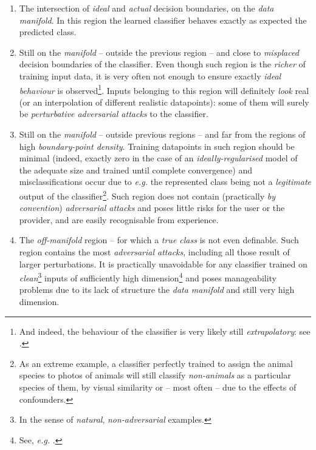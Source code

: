 \begin{enumerate}
    \item The intersection of \textit{ideal} and \textit{actual} decision boundaries, on the \textit{data manifold}. In this region the learned classifier behaves exactly as expected \wrt the predicted class.
    \item Still on the \textit{manifold} -- outside the previous region -- and close to \textit{misplaced} decision boundaries of the classifier. Even though such region is the \textit{richer} of training input data, it is very often not enough to ensure exactly \textit{ideal behaviour} is observed\footnote{And indeed, the behaviour of the classifier is very likely still \textit{extrapolatory}: see \cite{BalestrieroEtAl2021Extrapolation}.}. Inputs belonging to this region will definitely \textit{look} real (or an interpolation of different realistic datapoints): some of them will surely be \textit{perturbative adversarial attacks} to the classifier.
    \item Still on the \textit{manifold} -- outside previous regions -- and far from the regions of high \textit{boundary-point density}. Training datapoints in such region should be minimal (indeed, exactly zero in the case of an \textit{ideally-regularised} model of the adequate size and trained until complete convergence) and misclassifications occur due to \textit{e.g.} the represented class being not a \textit{legitimate} output of the classifier\footnote{As an extreme example, a classifier perfectly trained to assign the animal species to photos of animals will still classify \textit{non-animals} as a particular species of them, by visual similarity or -- most often -- due to the effects of confounders.}. Such region does not contain (practically \textit{by convention}) \textit{adversarial attacks} and poses little risks for the user or the provider, and are easily recognisable from experience.
    \item The \textit{off-manifold} region -- for which a \textit{true class} is not even definable. Such region contains the most \textit{adversarial attacks}, including all those result of larger perturbations. It is practically unavoidable for any classifier trained on \textit{clean}\footnote{In the sense of \textit{natural}, \textit{non-adversarial} examples.} inputs of sufficiently high dimension\footnote{See, \textit{e.g.} \cite{BortolussiSanguinetti2018IntrinsicGV}.} and poses manageability problems due to its lack of structure \wrt the \textit{data manifold} and still very high dimension.
\end{enumerate}

